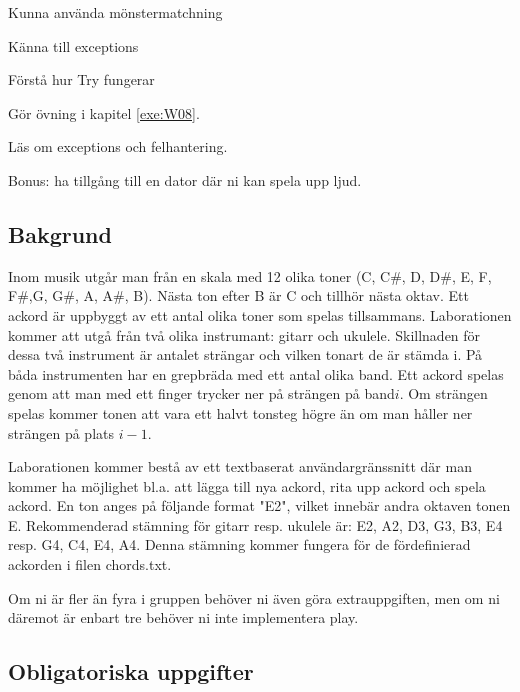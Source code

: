 

\Lab{\LabWeekEIGHT}

\begin{Goals}
\item Kunna använda mönstermatchning
\item Känna till exceptions
\item Förstå hur Try fungerar

\end{Goals}

\begin{Preparations}
\item Gör övning {\tt \ExeWeekEIGHT} i kapitel \ref{exe:W08}.
\item Läs om exceptions och felhantering.
\item Bonus: ha tillgång till en dator där ni kan spela upp ljud.
\end{Preparations}

\subsection{Bakgrund}
Inom musik utgår man från en skala med 12 olika toner (C, C\#, D, D\#, E, F, F\#,G, G\#, A, A\#, B). Nästa ton efter B är C och tillhör nästa oktav. Ett ackord är uppbyggt av ett antal olika toner som spelas tillsammans. Laborationen kommer att utgå från två olika instrumant: gitarr och ukulele. Skillnaden för dessa två instrument är antalet strängar och vilken tonart de är stämda i. På båda instrumenten har en grepbräda med ett antal olika band. Ett ackord spelas genom att man med ett finger trycker ner på strängen på band$i$. Om strängen spelas kommer tonen att vara ett halvt tonsteg högre än om man håller ner strängen på plats $i-1$.

Laborationen kommer bestå av ett textbaserat användargränssnitt där man kommer ha möjlighet bl.a. att lägga till nya ackord, rita upp ackord och spela ackord. En ton anges på följande format "E2", vilket innebär andra oktaven tonen E. Rekommenderad stämning för gitarr resp. ukulele är: E2, A2, D3, G3, B3, E4 resp. G4, C4, E4, A4. Denna stämning kommer fungera för de fördefinierad ackorden i filen chords.txt.

Om ni är fler än fyra i gruppen behöver ni även göra extrauppgiften, men om ni däremot är enbart tre behöver ni inte implementera play.

\subsection{Obligatoriska uppgifter}


